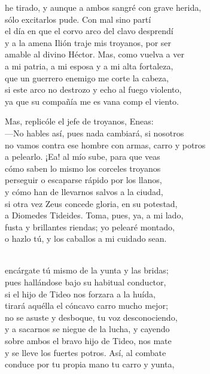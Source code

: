 he tirado, y aunque a ambos sangré con grave herida,\\
sólo excitarlos pude. Con mal sino partí\\
el día en que el corvo arco del clavo desprendí\\
y a la amena Ilión traje mis troyanos, por ser\\
amable al divino Héctor. Mas, como vuelva a ver\\
a mi patria, a mi esposa y a mi alta fortaleza,\\
que un guerrero enemigo me corte la cabeza,\\
si este arco no destrozo y echo al fuego violento,\\
ya que su compañía me es vana comp el viento.\par
Mas, replicóle el jefe de troyanos, Eneas:\\
---No hables así, pues nada cambiará, si nosotros\\
no vamos contra ese hombre con armas, carro y potros\\
a pelearlo. ¡Ea! al mío sube, para que veas\\
cómo saben lo mismo los corceles troyanos\\
perseguir o escaparse rápido por los llanos,\\
y cómo han de llevarnos salvos a la ciudad,\\
si otra vez Zeus concede gloria, en su potestad,\\
a Diomedes Tideides. Toma, pues, ya, a mi lado,\\
fusta y brillantes riendas; yo pelearé montado,\\
o hazlo tú, y los caballos a mi cuidado sean.\par
{}\\
encárgate tú mismo de la yunta y las bridas;\\
pues hallándose bajo su habitual conductor,\\
si el hijo de Tideo nos forzara a la huída,\\
tirará aquélla el cóncavo carro mucho mejor;\\
no se asuste y desboque, tu voz desconociendo,\\
y a sacarnos se niegue de la lucha, y cayendo\\
sobre ambos el bravo hijo de Tideo, nos mate\\
y se lleve los fuertes potros. Así, al combate\\
conduce por tu propia mano tu carro y yunta,\\
